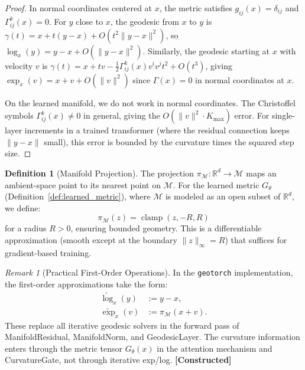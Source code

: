 \documentclass[11pt,a4paper]{article}
\theoremstyle{definition}
\newtheorem{definition}[theorem]{Definition}
\theoremstyle{remark}
\newtheorem{remark}[theorem]{Remark}
\newcommand{\R}{\mathbb{R}}
\newcommand{\statusconstructed}{\textcolor{blue!70!black}{\textbf{[Constructed]}}}
\begin{document}
\begin{proof}
In normal coordinates centered at $x$, the metric satisfies 
$g_{ij}(x) = \delta_{ij}$ and $\Gamma^k_{ij}(x) = 0$. For $y$ 
close to $x$, the geodesic from $x$ to $y$ is 
$\gamma(t) = x + t(y - x) + O(t^2 \|y - x\|^2)$, so 
$\log_x(y) = y - x + O(\|y - x\|^2)$. Similarly, the geodesic 
starting at $x$ with velocity $v$ is 
$\gamma(t) = x + tv - \tfrac{1}{2}\Gamma^k_{ij}(x) v^i v^j t^2 
+ O(t^3)$, giving $\exp_x(v) = x + v + O(\|v\|^2)$ since 
$\Gamma(x) = 0$ in normal coordinates at $x$.

On the learned manifold, we do not work in normal coordinates. 
The Christoffel symbols $\Gamma^k_{ij}(x) \neq 0$ in general, 
giving the $O(\|v\|^2 \cdot K_{\max})$ error. For single-layer 
increments in a trained transformer (where the residual 
connection keeps $\|y - x\|$ small), this error is bounded by 
the curvature times the squared step size.
\end{proof}

\begin{definition}[Manifold Projection]\label{def:projection}
The projection $\pi_{\mathcal{M}} : \R^d \to \mathcal{M}$ maps 
an ambient-space point to its nearest point on $\mathcal{M}$. 
For the learned metric $G_\theta$ 
(Definition~\ref{def:learned_metric}), where $\mathcal{M}$ is 
modeled as an open subset of $\R^d$, we define:
\begin{equation}\label{eq:projection_clamp}
    \pi_{\mathcal{M}}(z) = \operatorname{clamp}(z, -R, R)
\end{equation}
for a radius $R > 0$, ensuring bounded geometry. This is 
a differentiable approximation (smooth except at the boundary 
$\|z\|_\infty = R$) that suffices for gradient-based training.
\end{definition}

\begin{remark}[Practical First-Order Operations]%
\label{rem:practical_ops}
In the \texttt{geotorch} implementation, the first-order 
approximations take the form:
\begin{align}
  \widetilde{\log}_x(y) &:= y - x, 
  \label{eq:log_tilde} \\
  \widetilde{\exp}_x(v) &:= \pi_{\mathcal{M}}(x + v).
  \label{eq:exp_tilde}
\end{align}
These replace all iterative geodesic solvers in the forward pass 
of ManifoldResidual, ManifoldNorm, and GeodesicLayer. The 
curvature information enters through the metric tensor 
$G_\theta(x)$ in the attention mechanism and CurvatureGate, not 
through iterative exp/log. \statusconstructed
\end{remark}
\end{document}
